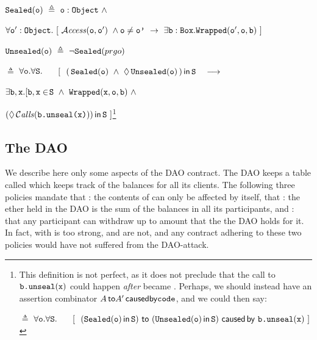 \documentclass[acmsmall,screen]{acmart}
\begin{document}
$\prg{Sealed}(\prg{o}) \  \triangleq\ \prg{o}:\prg{Object}\ \wedge$\\
\strut \hspace{2.75cm}$ \forall \prg{o}':\prg{Object}.\ [ \ \CanAccess{\prg{o}}{\prg{o}'}\ \wedge \prg{o}\neq\prg{o'}\ \rightarrow\ \exists \prg{b}:\prg{Box}.\prg{Wrapped}(\prg{o}',\prg{o},\prg{b})\ ]$

$\prg{Unsealed}(\prg{o}) \  \triangleq\ \neg \prg{Sealed}(prg{o})$

\hspace{.05cm}

 $\triangleq$  $\forall {\mbox{\tt{o}}}.\forall{{\mbox{\tt{S}}}}.$ \ \
$[\ \ \Using{(\, \prg{Sealed}(\prg{o}) \ \wedge\ {\Future{\prg{Unsealed}({\prg{o}})}}\, )}{\prg{S}} \ \ \ \longrightarrow $\\
\strut \hspace{8cm}$ \exists \prg{b},\prg{x}.[ \prg{b},\prg{x}\in\!\prg{S}\ \wedge\   \prg{Wrapped}(\prg{x},\prg{o},\prg{b}) \ \wedge$\\
\strut \hspace{9cm}$\Using{(\Future{\Calls{\prg{b.unseal}(\prg{x})}})}{\prg{S}}\ ]
$\footnote{This definition is not perfect, as it does not preclude that the call to ${\mbox{\tt{b.unseal}}}({\mbox{\tt{x}}})$ could happen {\em after}
\prg{o} became \prg{Unsealed}. Perhaps, we should instead have an assertion combinator ${A\, {\bf{\sf {to}}} A'\,{\bf{\sf {caused by}}} {\mbox{\tt{code}}}}$, and we could then say:

 $\triangleq$  $\forall {\mbox{\tt{o}}}.\forall{{\mbox{\tt{S}}}}.$ \ \
$[\ \ (\Using{{\prg{Sealed}(\prg{o})}}{\prg{S}}) \  \kw{to}\  (\Using{\prg{Unsealed}({\prg{o}})}{\prg{S}})\ \kw{caused\,by}\  \prg{b.unseal}{(\prg{x})} \ ]$
}




\subsection{The DAO }

We describe here only some aspects of the DAO contract.
The DAO keeps a table called  which keeps track of the balances for all its clients.
 The following three policies mandate that \Pol {DAO\_1}: the contents of  can only be affected by 
 itself, that : the ether held in the DAO is the sum of the balances in all its participants, and : that any
 participant can withdraw up to amount that the the DAO holds for it.
 In fact, with \Pol {DAO\_2} is too strong, \Pol {DAO\_1} and \Pol {DAO\_3} are not, and any
 contract adhering to these two policies would have not suffered from the DAO-attack\cite{...}.
\end{document}
